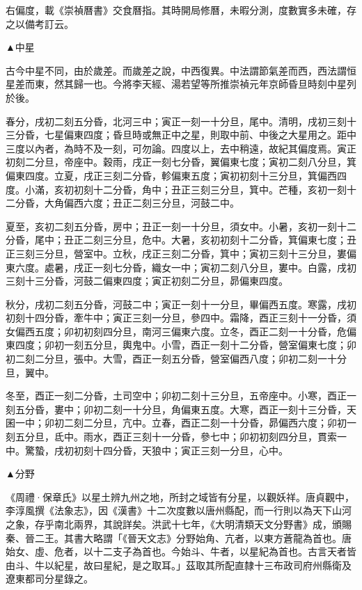 \begin{pinyinscope}
右偏度，載《崇禎曆書》交食曆指。其時開局修曆，未暇分測，度數實多未確，存之以備考訂云。

▲中星

古今中星不同，由於歲差。而歲差之說，中西復異。中法謂節氣差而西，西法謂恒星差而東，然其歸一也。今將李天經、湯若望等所推崇禎元年京師昏旦時刻中星列於後。

春分，戌初二刻五分昏，北河三中；寅正一刻一十分旦，尾中。清明，戌初三刻十三分昏，七星偏東四度；昏旦時或無正中之星，則取中前、中後之大星用之。距中三度以內者，為時不及一刻，可勿論。四度以上，去中稍遠，故紀其偏度焉。寅正初刻二分旦，帝座中。穀雨，戌正一刻七分昏，翼偏東七度；寅初二刻八分旦，箕偏東四度。立夏，戌正三刻二分昏，軫偏東五度；寅初初刻十三分旦，箕偏西四度。小滿，亥初初刻十二分昏，角中；丑正三刻三分旦，箕中。芒種，亥初一刻十二分昏，大角偏西六度；丑正二刻三分旦，河鼓二中。

夏至，亥初二刻五分昏，房中；丑正一刻一十分旦，須女中。小暑，亥初一刻十二分昏，尾中；丑正二刻三分旦，危中。大暑，亥初初刻十二分昏，箕偏東七度；丑正三刻三分旦，營室中。立秋，戌正三刻二分昏，箕中；寅初三刻十三分旦，婁偏東六度。處暑，戌正一刻七分昏，織女一中；寅初二刻八分旦，婁中。白露，戌初三刻十三分昏，河鼓二偏東四度；寅正初刻二分旦，昴偏東四度。

秋分，戌初二刻五分昏，河鼓二中；寅正一刻十一分旦，畢偏西五度。寒露，戌初初刻十四分昏，牽牛中；寅正三刻一分旦，參四中。霜降，酉正三刻十一分昏，須女偏西五度；卯初初刻四分旦，南河三偏東六度。立冬，酉正二刻一十分昏，危偏東四度；卯初一刻五分旦，輿鬼中。小雪，酉正一刻十二分昏，營室偏東七度；卯初二刻二分旦，張中。大雪，酉正一刻五分昏，營室偏西八度；卯初二刻一十分旦，翼中。

冬至，酉正一刻二分昏，土司空中；卯初二刻十三分旦，五帝座中。小寒，酉正一刻五分昏，婁中；卯初二刻一十分旦，角偏東五度。大寒，酉正一刻十三分昏，天囷一中；卯初二刻二分旦，亢中。立春，酉正二刻一十分昏，昴偏西六度；卯初一刻五分旦，氐中。雨水，酉正三刻十一分昏，參七中；卯初初刻四分旦，貫索一中。驚蟄，戌初初刻十四分昏，天狼中；寅正三刻一分旦，心中。

▲分野

《周禮·保章氏》以星土辨九州之地，所封之域皆有分星，以觀妖祥。唐貞觀中，李淳風撰《法象志》，因《漢書》十二次度數以唐州縣配，而一行則以為天下山河之象，存乎南北兩界，其說詳矣。洪武十七年，《大明清類天文分野書》成，頒賜秦、晉二王。其書大略謂「《晉天文志》分野始角、亢者，以東方蒼龍為首也。唐始女、虛、危者，以十二支子為首也。今始斗、牛者，以星紀為首也。古言天者皆由斗、牛以紀星，故曰星紀，是之取耳。」茲取其所配直隸十三布政司府州縣衛及遼東都司分星錄之。


\end{pinyinscope}
